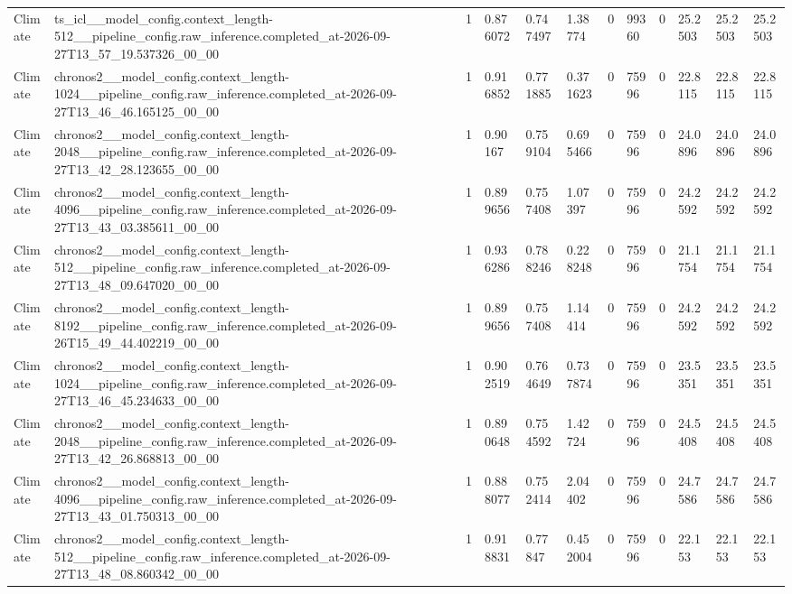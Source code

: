 \begin{tabular}{llllllllllll}
Climate & ts\_icl\_\_model\_config.context\_length-512\_\_pipeline\_config.raw\_inference.completed\_at-2026-09-27T13\_57\_19.537326\_00\_00 & 1 & 0.876072 & 0.747497 & 1.38774 & 0 & 99360 & 0 & 25.2503 & 25.2503 & 25.2503 \\
Climate & chronos2\_\_model\_config.context\_length-1024\_\_pipeline\_config.raw\_inference.completed\_at-2026-09-27T13\_46\_46.165125\_00\_00 & 1 & 0.916852 & 0.771885 & 0.371623 & 0 & 75996 & 0 & 22.8115 & 22.8115 & 22.8115 \\
Climate & chronos2\_\_model\_config.context\_length-2048\_\_pipeline\_config.raw\_inference.completed\_at-2026-09-27T13\_42\_28.123655\_00\_00 & 1 & 0.90167 & 0.759104 & 0.695466 & 0 & 75996 & 0 & 24.0896 & 24.0896 & 24.0896 \\
Climate & chronos2\_\_model\_config.context\_length-4096\_\_pipeline\_config.raw\_inference.completed\_at-2026-09-27T13\_43\_03.385611\_00\_00 & 1 & 0.899656 & 0.757408 & 1.07397 & 0 & 75996 & 0 & 24.2592 & 24.2592 & 24.2592 \\
Climate & chronos2\_\_model\_config.context\_length-512\_\_pipeline\_config.raw\_inference.completed\_at-2026-09-27T13\_48\_09.647020\_00\_00 & 1 & 0.936286 & 0.788246 & 0.228248 & 0 & 75996 & 0 & 21.1754 & 21.1754 & 21.1754 \\
Climate & chronos2\_\_model\_config.context\_length-8192\_\_pipeline\_config.raw\_inference.completed\_at-2026-09-26T15\_49\_44.402219\_00\_00 & 1 & 0.899656 & 0.757408 & 1.14414 & 0 & 75996 & 0 & 24.2592 & 24.2592 & 24.2592 \\
Climate & chronos2\_\_model\_config.context\_length-1024\_\_pipeline\_config.raw\_inference.completed\_at-2026-09-27T13\_46\_45.234633\_00\_00 & 1 & 0.902519 & 0.764649 & 0.737874 & 0 & 75996 & 0 & 23.5351 & 23.5351 & 23.5351 \\
Climate & chronos2\_\_model\_config.context\_length-2048\_\_pipeline\_config.raw\_inference.completed\_at-2026-09-27T13\_42\_26.868813\_00\_00 & 1 & 0.890648 & 0.754592 & 1.42724 & 0 & 75996 & 0 & 24.5408 & 24.5408 & 24.5408 \\
Climate & chronos2\_\_model\_config.context\_length-4096\_\_pipeline\_config.raw\_inference.completed\_at-2026-09-27T13\_43\_01.750313\_00\_00 & 1 & 0.888077 & 0.752414 & 2.04402 & 0 & 75996 & 0 & 24.7586 & 24.7586 & 24.7586 \\
Climate & chronos2\_\_model\_config.context\_length-512\_\_pipeline\_config.raw\_inference.completed\_at-2026-09-27T13\_48\_08.860342\_00\_00 & 1 & 0.918831 & 0.77847 & 0.452004 & 0 & 75996 & 0 & 22.153 & 22.153 & 22.153 \\

\end{tabular}
